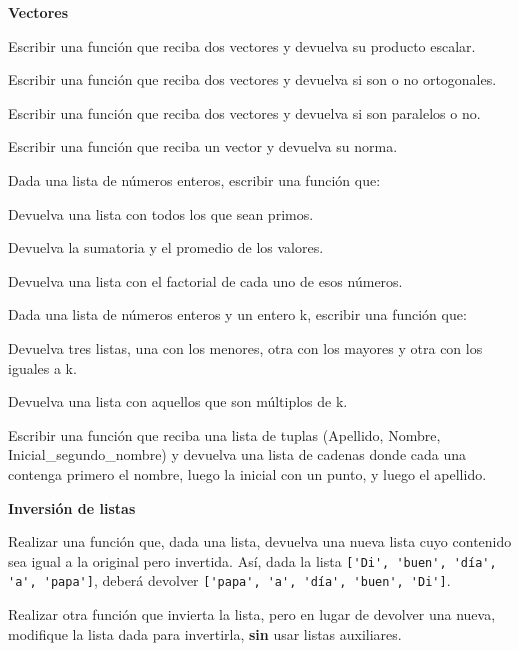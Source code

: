\begin{ejercicio}
{\bf Vectores}
\begin{partes}
\item Escribir una función que reciba dos vectores y devuelva su producto
escalar.
\item Escribir una función que reciba dos vectores y devuelva si son o no
ortogonales.
\item Escribir una función que reciba dos vectores y devuelva si son
paralelos o no.
\item Escribir una función que reciba un vector y devuelva su norma.
\end{partes}
\end{ejercicio}


\begin{ejercicio}
Dada una lista de números enteros, escribir una función que:
\begin{partes}
\item Devuelva una lista con todos los que sean primos.
\item Devuelva la sumatoria y el promedio de los valores.
\item Devuelva una lista con el factorial de cada uno de esos números.
\end{partes}
\end{ejercicio}


\begin{ejercicio}
Dada una lista de números enteros y un entero k, escribir una función que:
\begin{partes}
\item Devuelva tres listas, una con los menores, otra con los mayores y
otra con los iguales a k.
\item Devuelva una lista con aquellos que son múltiplos de k.
\end{partes}
\end{ejercicio}


\begin{ejercicio}
Escribir una función que reciba una lista de tuplas (Apellido,
Nombre, Inicial\_segundo\_nombre) y devuelva una lista de cadenas
donde cada una contenga primero el nombre, luego la inicial con un punto, y luego el
apellido.
\end{ejercicio}


\begin{ejercicio}{ \bf Inversión de listas}
\begin{partes}
\item Realizar una función que, dada una lista, devuelva una nueva lista cuyo
contenido sea igual a la original pero invertida. Así, dada la lista
\lstinline!['Di', 'buen', 'día', 'a', 'papa']!, deberá devolver
\lstinline!['papa', 'a', 'día', 'buen', 'Di']!.

\item Realizar otra función que invierta la lista, pero en lugar de devolver
una nueva, modifique la lista dada para invertirla, {\bf sin}  usar listas
auxiliares.
\end{partes}
\end{ejercicio}


